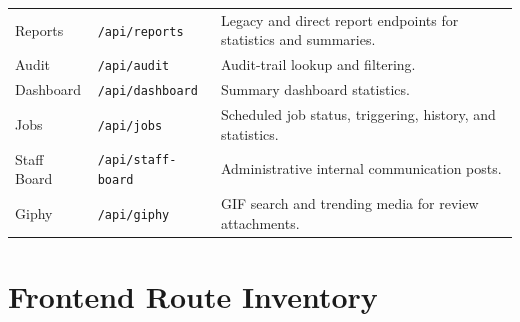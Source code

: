 \documentclass[12pt,a4paper]{report}
\begin{document}
\begin{longtable}{p{} p{} p{}}
Reports & \texttt{/api/reports} & Legacy and direct report endpoints for statistics and summaries. \\
Audit & \texttt{/api/audit} & Audit-trail lookup and filtering. \\
Dashboard & \texttt{/api/dashboard} & Summary dashboard statistics. \\
Jobs & \texttt{/api/jobs} & Scheduled job status, triggering, history, and statistics. \\
Staff Board & \texttt{/api/staff-board} & Administrative internal communication posts. \\
Giphy & \texttt{/api/giphy} & GIF search and trending media for review attachments. \\
\bottomrule
\end{longtable}

\chapter{Frontend Route Inventory}
\end{document}
